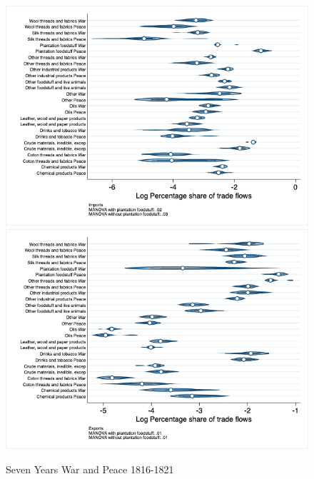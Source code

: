 \documentclass[12pt,a4paper,notitlepage,english]{article}
\begin{document}
\begin{figure}
\centering
\caption{Seven Years War and Peace 1816-1821}
\label{seven_peace1764_1777_nat_distr}
\includegraphics[scale=.4]{seven_peace1764_1777_nat_distr_Isitc}
\includegraphics[scale=.4]{seven_peace1764_1777_nat_distr_Xsitc}
\end{figure}
\end{document}

